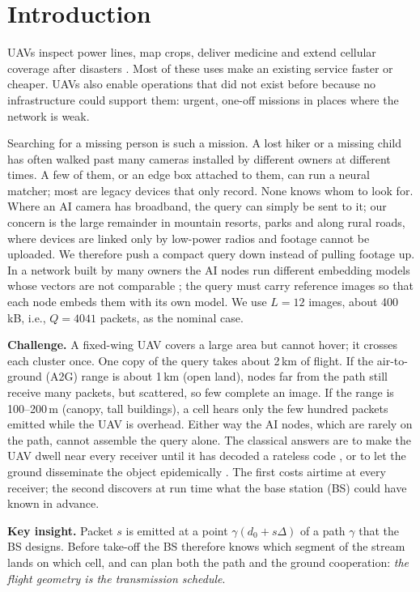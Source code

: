 \section{Introduction}
UAVs inspect power lines, map crops, deliver medicine and extend cellular coverage after disasters
\cite{zeng2016mag,mozaffari2019}. Most of these uses make an existing service faster or cheaper. UAVs also enable
operations that did not exist before because no infrastructure could support them: urgent, one-off missions in places
where the network is weak.

Searching for a missing person is such a mission. A lost hiker or a missing child has often walked past many cameras
installed by different owners at different times. A few of them, or an edge box attached to them, can run a neural
matcher; most are legacy devices that only record. None knows whom to look for. Where an AI camera has broadband, the
query can simply be sent to it; our concern is the large remainder in mountain resorts, parks and along rural roads, where
devices are linked only by low-power radios and footage cannot be uploaded. We therefore push a compact query down
instead of pulling footage up. In a network built by many owners the AI nodes run different embedding models whose
vectors are not comparable \cite{shen2020}; the query must carry reference images so that each node embeds them with its
own model. We use $L=12$ images, about 400\,kB, i.e., $Q=4041$ packets, as the nominal case.

\textbf{Challenge.} A fixed-wing UAV covers a large area but cannot hover; it crosses each cluster once. One copy of the
query takes about 2\,km of flight. If the air-to-ground (A2G) range is about 1\,km (open land), nodes far from the path
still receive many packets, but scattered, so few complete an image. If the range is 100--200\,m (canopy, tall buildings),
a cell hears only the few hundred packets emitted while the UAV is overhead. Either way the AI nodes, which are rarely on
the path, cannot assemble the query alone. The classical answers are to make the UAV dwell near every receiver until it
has decoded a rateless code \cite{zeng2018multicast,luby2002}, or to let the ground disseminate the object epidemically
\cite{hui2004,levis2004}. The first costs airtime at every receiver; the second discovers at run time what the base
station (BS) could have known in advance.

\textbf{Key insight.} Packet $s$ is emitted at a point $\gamma(d_0+s\Delta)$ of a path $\gamma$ that the BS designs.
Before take-off the BS therefore knows which segment of the stream lands on which cell, and can plan both the path and the
ground cooperation: \emph{the flight geometry is the transmission schedule}.

